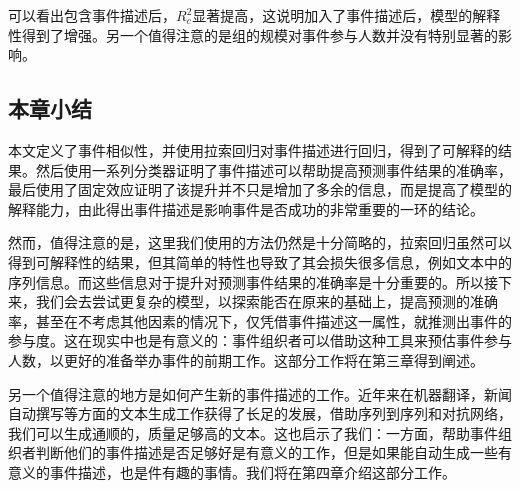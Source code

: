 可以看出包含事件描述后，\(R_c^2\)显著提高，这说明加入了事件描述后，模型的解释性得到了增强。另一个值得注意的是组的规模对事件参与人数并没有特别显著的影响。

\subsection{本章小结}
本文定义了事件相似性，并使用拉索回归对事件描述进行回归，得到了可解释的结果。然后使用一系列分类器证明了事件描述可以帮助提高预测事件结果的准确率，最后使用了固定效应证明了该提升并不只是增加了多余的信息，而是提高了模型的解释能力，由此得出事件描述是影响事件是否成功的非常重要的一环的结论。

然而，值得注意的是，这里我们使用的方法仍然是十分简略的，拉索回归虽然可以得到可解释性的结果，但其简单的特性也导致了其会损失很多信息，例如文本中的序列信息。而这些信息对于提升对预测事件结果的准确率是十分重要的。所以接下来，我们会去尝试更复杂的模型，以探索能否在原来的基础上，提高预测的准确率，甚至在不考虑其他因素的情况下，仅凭借事件描述这一属性，就推测出事件的参与度。这在现实中也是有意义的：事件组织者可以借助这种工具来预估事件参与人数，以更好的准备举办事件的前期工作。这部分工作将在第三章得到阐述。

另一个值得注意的地方是如何产生新的事件描述的工作。近年来在机器翻译，新闻自动撰写等方面的文本生成工作获得了长足的发展，借助序列到序列和对抗网络，我们可以生成通顺的，质量足够高的文本。这也启示了我们：一方面，帮助事件组织者判断他们的事件描述是否足够好是有意义的工作，但是如果能自动生成一些有意义的事件描述，也是件有趣的事情。我们将在第四章介绍这部分工作。
% 